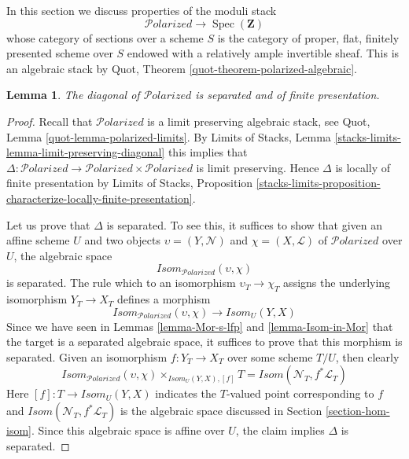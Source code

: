 \documentclass{stacks-project}
\theoremstyle{plain}
\newtheorem{lemma}[subsection]{Lemma}
\theoremstyle{definition}
\theoremstyle{remark}
\numberwithin{equation}{subsection}
\def\Spec{\mathop{\mathrm{Spec}}}
\def\Polarizedstack{\mathcal{P}\!\mathit{olarized}}
\begin{document}
\noindent
In this section we discuss properties of the moduli stack
$$
\Polarizedstack \longrightarrow \Spec(\mathbf{Z})
$$
whose category of sections over a scheme $S$ is the category of
proper, flat, finitely presented scheme over $S$ endowed
with a relatively ample invertible sheaf. This is an algebraic
stack by Quot, Theorem \ref{quot-theorem-polarized-algebraic}.

\begin{lemma}
\label{lemma-polarized-diagonal-separated-fp}
The diagonal of $\Polarizedstack$ is separated
and of finite presentation.
\end{lemma}

\begin{proof}
Recall that $\Polarizedstack$ is a limit preserving algebraic stack, see
Quot, Lemma \ref{quot-lemma-polarized-limits}.
By Limits of Stacks, Lemma \ref{stacks-limits-lemma-limit-preserving-diagonal}
this implies that
$\Delta : \Polarizedstack \to \Polarizedstack \times \Polarizedstack$
is limit preserving. Hence $\Delta$ is locally of finite presentation
by Limits of Stacks, Proposition
\ref{stacks-limits-proposition-characterize-locally-finite-presentation}.

\medskip\noindent
Let us prove that $\Delta$ is separated. To see this, it suffices to show
that given an affine scheme $U$ and two objects
$\upsilon = (Y, \mathcal{N})$ and $\chi = (X, \mathcal{L})$
of $\Polarizedstack$ over $U$, the algebraic
space
$$
\mathit{Isom}_{\Polarizedstack}(\upsilon, \chi)
$$
is separated. The rule which to an isomorphism $\upsilon_T \to \chi_T$
assigns the underlying isomorphism $Y_T \to X_T$ defines a morphism
$$
\mathit{Isom}_{\Polarizedstack}(\upsilon, \chi)
\longrightarrow
\mathit{Isom}_U(Y, X)
$$
Since we have seen in Lemmas \ref{lemma-Mor-s-lfp} and
\ref{lemma-Isom-in-Mor} that the target is
a separated algebraic space, it suffices to prove that this morphism
is separated. Given an isomorphism $f : Y_T \to X_T$
over some scheme $T/U$, then clearly
$$
\mathit{Isom}_{\Polarizedstack}(\upsilon, \chi)
\times_{\mathit{Isom}_U(Y, X), [f]} T
=
\mathit{Isom}(\mathcal{N}_T, f^*\mathcal{L}_T)
$$
Here $[f] : T \to \mathit{Isom}_U(Y, X)$ indicates the $T$-valued
point corresponding to $f$ and
$\mathit{Isom}(\mathcal{N}_T, f^*\mathcal{L}_T)$
is the algebraic space discussed in Section \ref{section-hom-isom}.
Since this algebraic space is affine over $U$, the claim implies
$\Delta$ is separated.


\end{proof}
\end{document}
